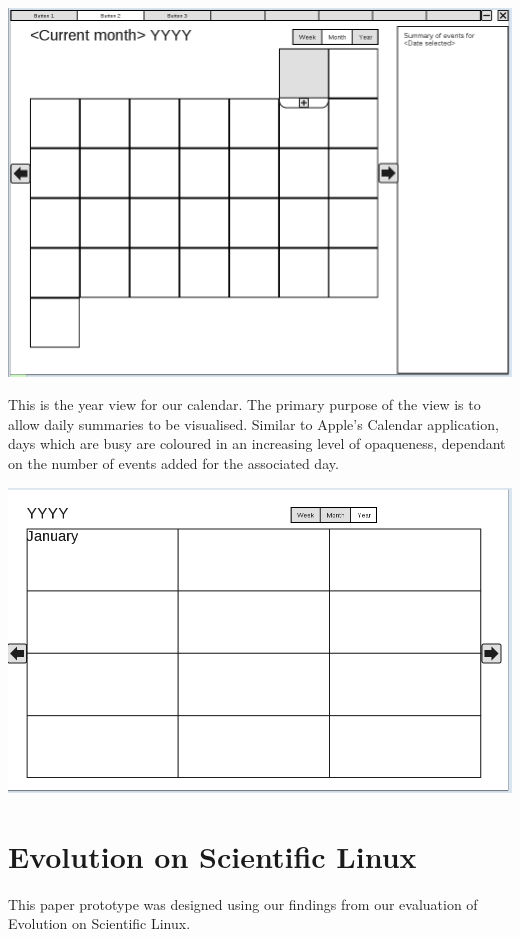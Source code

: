 \documentclass{article}
\begin{document}
\includegraphics[scale=0.45,angle=90]{CMCLGDRMonth.png}

\pagebreak

This is the year view for our calendar. The primary purpose of the view is to
allow daily summaries to be visualised. Similar to Apple's Calendar application,
days which are busy are coloured in an increasing level of opaqueness,
dependant on the number of events added for the associated day.

\includegraphics[scale=0.45,angle=90]{CMCLGDRYear.png}

\section{Evolution on Scientific Linux}

This paper prototype was designed using our findings from our evaluation 
of Evolution on Scientific Linux.
\end{document}
